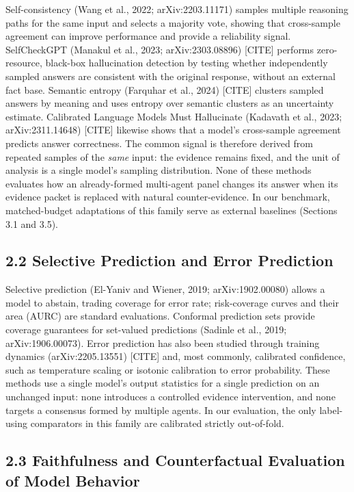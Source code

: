 \documentclass[11pt]{article}
\begin{document}
Self-consistency (Wang et al., 2022; arXiv:2203.11171) samples multiple reasoning paths for the same input and selects a majority vote, showing that cross-sample agreement can improve performance and provide a reliability signal. SelfCheckGPT (Manakul et al., 2023; arXiv:2303.08896) [CITE] performs zero-resource, black-box hallucination detection by testing whether independently sampled answers are consistent with the original response, without an external fact base. Semantic entropy (Farquhar et al., 2024) [CITE] clusters sampled answers by meaning and uses entropy over semantic clusters as an uncertainty estimate. Calibrated Language Models Must Hallucinate (Kadavath et al., 2023; arXiv:2311.14648) [CITE] likewise shows that a model's cross-sample agreement predicts answer correctness. The common signal is therefore derived from repeated samples of the \emph{same} input: the evidence remains fixed, and the unit of analysis is a single model's sampling distribution. None of these methods evaluates how an already-formed multi-agent panel changes its answer when its evidence packet is replaced with natural counter-evidence. In our benchmark, matched-budget adaptations of this family serve as external baselines (Sections 3.1 and 3.5).

\subsection{2.2 Selective Prediction and Error Prediction}

Selective prediction (El-Yaniv and Wiener, 2019; arXiv:1902.00080) allows a model to abstain, trading coverage for error rate; risk-coverage curves and their area (AURC) are standard evaluations. Conformal prediction sets provide coverage guarantees for set-valued predictions (Sadinle et al., 2019; arXiv:1906.00073). Error prediction has also been studied through training dynamics (arXiv:2205.13551) [CITE] and, most commonly, calibrated confidence, such as temperature scaling or isotonic calibration to error probability. These methods use a single model's output statistics for a single prediction on an unchanged input: none introduces a controlled evidence intervention, and none targets a consensus formed by multiple agents. In our evaluation, the only label-using comparators in this family are calibrated strictly out-of-fold.

\subsection{2.3 Faithfulness and Counterfactual Evaluation of Model Behavior}
\end{document}
